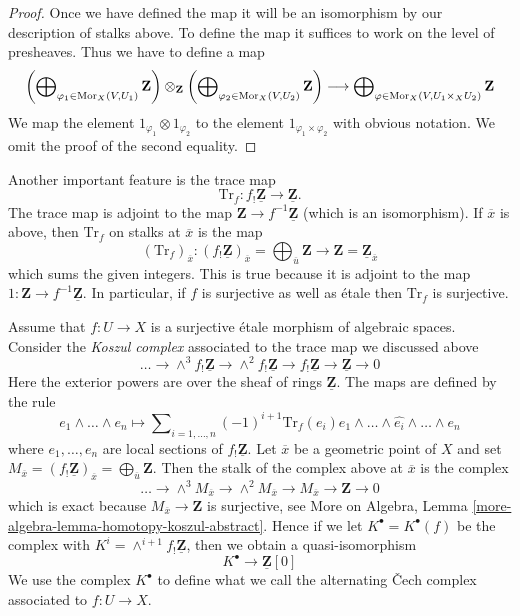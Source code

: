 \begin{proof}
Once we have defined the map it will be an isomorphism by our description
of stalks above. To define the map it suffices to work on the level of
presheaves. Thus we have to define a map
$$
\left(\bigoplus\nolimits_{\varphi_1 \in \mathop{\mathrm{Mor}}\nolimits_X(V, U_1)} \mathbf{Z}\right)
\otimes_{\mathbf{Z}}
\left(\bigoplus\nolimits_{\varphi_2 \in \mathop{\mathrm{Mor}}\nolimits_X(V, U_2)} \mathbf{Z}\right)
\longrightarrow
\bigoplus\nolimits_{\varphi \in \mathop{\mathrm{Mor}}\nolimits_X(V, U_1 \times_X U_2)}
\mathbf{Z}
$$
We map the element $1_{\varphi_1} \otimes 1_{\varphi_2}$ to the element
$1_{\varphi_1 \times \varphi_2}$ with obvious notation. We omit the proof
of the second equality.
\end{proof}

\noindent
Another important feature is the trace map
$$
\text{Tr}_f : f_!\underline{\mathbf{Z}} \longrightarrow \underline{\mathbf{Z}}.
$$
The trace map is adjoint to the
map $\mathbf{Z} \to f^{-1}\underline{\mathbf{Z}}$ (which is an isomorphism).
If $\overline{x}$ is above, then $\text{Tr}_f$ on stalks at $\overline{x}$
is the map
$$
(\text{Tr}_f)_{\overline{x}} :
(f_!\underline{\mathbf{Z}})_{\overline{x}} =
\bigoplus\nolimits_{\overline{u}} \mathbf{Z}
\longrightarrow
\mathbf{Z} = \underline{\mathbf{Z}}_{\overline{x}}
$$
which sums the given integers. This is true because it is adjoint to the map
$1 : \mathbf{Z} \to f^{-1}\underline{\mathbf{Z}}$. In particular, if
$f$ is surjective as well as \'etale then $\text{Tr}_f$ is surjective.

\medskip\noindent
Assume that $f : U \to X$ is a surjective \'etale
morphism of algebraic spaces. Consider the {\it Koszul complex}
associated to the trace map we discussed above
$$
\ldots \to \wedge^3f_!\underline{\mathbf{Z}} \to
\wedge^2f_!\underline{\mathbf{Z}} \to f_!\underline{\mathbf{Z}} \to
\underline{\mathbf{Z}} \to 0
$$
Here the exterior powers are over the sheaf of rings $\underline{\mathbf{Z}}$.
The maps are defined by the rule
$$
e_1 \wedge \ldots \wedge e_n \longmapsto
\sum\nolimits_{i = 1, \ldots, n} (-1)^{i + 1}
\text{Tr}_f(e_i)
e_1 \wedge \ldots \wedge \widehat{e_i} \wedge \ldots \wedge e_n
$$
where $e_1, \ldots, e_n$ are local sections of $f_!\underline{\mathbf{Z}}$.
Let $\overline{x}$ be a geometric point of $X$ and set
$M_{\overline{x}} = (f_!\underline{\mathbf{Z}})_{\overline{x}} =
\bigoplus_{\overline{u}} \mathbf{Z}$. Then the stalk of the complex above at
$\overline{x}$ is the complex
$$
\ldots \to \wedge^3 M_{\overline{x}} \to \wedge^2 M_{\overline{x}}
\to M_{\overline{x}} \to \mathbf{Z} \to 0
$$
which is exact because $M_{\overline{x}} \to \mathbf{Z}$ is surjective, see
More on Algebra, Lemma \ref{more-algebra-lemma-homotopy-koszul-abstract}.
Hence if we let $K^\bullet = K^\bullet(f)$ be the complex with
$K^i = \wedge^{i + 1}f_!\underline{\mathbf{Z}}$, then we obtain a
quasi-isomorphism
\begin{equation}
\label{equation-quasi-isomorphism}
K^\bullet \longrightarrow \underline{\mathbf{Z}}[0]
\end{equation}
We use the complex $K^\bullet$ to define what we call
the alternating {\v C}ech complex associated to $f : U \to X$.

